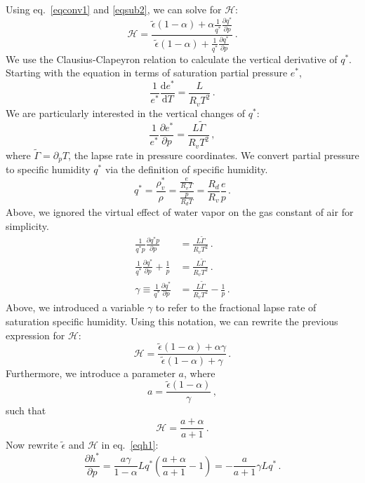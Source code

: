 \documentclass{article}
\begin{document}
Using eq.~\ref{eqconv1} and \ref{eqsub2}, we can solve for $\mathcal{H}$:
\begin{equation}
\mathcal{H} = \frac{\tilde{\epsilon}(1-\alpha) + \alpha \frac{1}{q^*}\frac{\partial q^*}{\partial p}}{\tilde{\epsilon}(1-\alpha) + \frac{1}{q^*}\frac{\partial q^*}{\partial p}} \, . 
\end{equation}
We use the Clausius-Clapeyron relation to calculate the vertical derivative of $q^*$. Starting with the equation in terms of saturation partial pressure $e^*$,
\begin{equation}
\frac{1}{e^*}\frac{\mathrm{d}e^*}{\mathrm{d}T} = \frac{L}{R_vT^2} \, .
\end{equation}
We are particularly interested in the vertical changes of $q^*$:
\begin{equation}
\frac{1}{e^*}\frac{\partial e^*}{\partial p} = \frac{L\tilde{\Gamma}}{R_vT^2} \, ,
\end{equation}
where $\tilde{\Gamma} = \partial_p T$, the lapse rate in pressure coordinates. We convert partial pressure to specific humidity $q^*$ via the definition of specific humidity.
\begin{equation}
q^* = \frac{\rho_v^*}{\rho} = \frac{\frac{e}{R_vT}}{\frac{p}{R_dT}} = \frac{R_d}{R_v}\frac{e}{p} \, .
\end{equation}
Above, we ignored the virtual effect of water vapor on the gas constant of air for simplicity.
\begin{align}
\frac{1}{q^*p}\frac{\partial q^*p}{\partial p} &= \frac{L\tilde{\Gamma}}{R_vT^2} \, . \\
\frac{1}{q^*}\frac{\partial q^*}{\partial p} + \frac{1}{p} &= \frac{L\tilde{\Gamma}}{R_vT^2} \, . \\
\gamma \equiv \frac{1}{q^*}\frac{\partial q^*}{\partial p} &= \frac{L\tilde{\Gamma}}{R_vT^2} - \frac{1}{p} \, .
\end{align}
Above, we introduced a variable $\gamma$ to refer to the fractional lapse rate of saturation specific humidity. Using this notation, we can rewrite the previous expression for $\mathcal{H}$:
\begin{equation}
\mathcal{H} = \frac{\tilde{\epsilon}(1-\alpha) + \alpha\gamma}{\tilde{\epsilon}(1-\alpha)+\gamma} \, .
\end{equation}
Furthermore, we introduce a parameter $a$, where
\begin{equation}
\label{eqdefa}
a = \frac{\tilde{\epsilon}(1-\alpha)}{\gamma} \, ,
\end{equation}
such that
\begin{equation}
\mathcal{H} = \frac{a + \alpha}{a + 1} \, .
\end{equation}
Now rewrite $\tilde{\epsilon}$ and $\mathcal{H}$ in eq.~\ref{eqh1}:
\begin{equation}
\label{eqh2}
\frac{\partial h^*}{\partial p} = \frac{a\gamma}{1-\alpha}Lq^*\left(\frac{a+\alpha}{a+1}-1\right) = -\frac{a}{a+1}\gamma Lq^* \, .
\end{equation}
\end{document}
